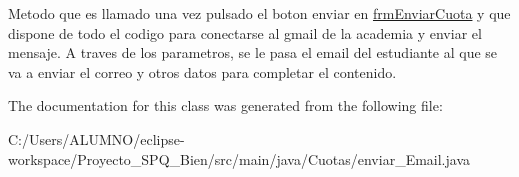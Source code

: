 Metodo que es llamado una vez pulsado el boton enviar en \hyperlink{class_cuotas_1_1frm_enviar_cuota}{frm\+Enviar\+Cuota} y que dispone de todo el codigo para conectarse al gmail de la academia y enviar el mensaje. A traves de los parametros, se le pasa el email del estudiante al que se va a enviar el correo y otros datos para completar el contenido. 

The documentation for this class was generated from the following file\+:\begin{DoxyCompactItemize}
\item 
C\+:/\+Users/\+A\+L\+U\+M\+N\+O/eclipse-\/workspace/\+Proyecto\+\_\+\+S\+P\+Q\+\_\+Bien/src/main/java/\+Cuotas/enviar\+\_\+\+Email.\+java\end{DoxyCompactItemize}
